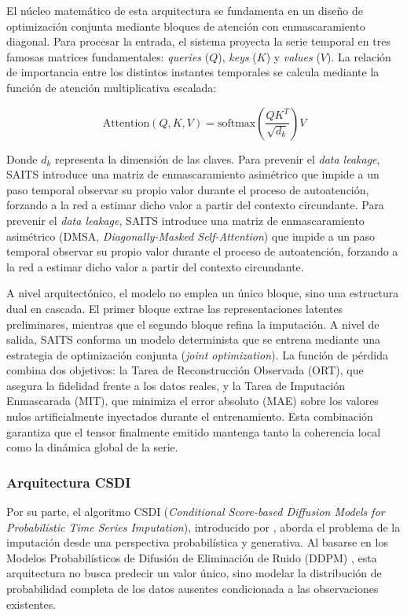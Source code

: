 El núcleo matemático de esta arquitectura se fundamenta en un diseño de optimización conjunta mediante bloques de atención con enmascaramiento diagonal. Para procesar la entrada, el sistema proyecta la serie temporal en tres famosas matrices fundamentales: \textit{queries} ($Q$), \textit{keys} ($K$) y \textit{values} ($V$). La relación de importancia entre los distintos instantes temporales se calcula mediante la función de atención multiplicativa escalada:

\begin{equation}
	\text{Attention}(Q, K, V) = \text{softmax}\left(\frac{QK^T}{\sqrt{d_k}}\right)V
\end{equation}

Donde $d_k$ representa la dimensión de las claves. Para prevenir el \textit{data leakage}, SAITS introduce una matriz de enmascaramiento asimétrico que impide a un paso temporal observar su propio valor durante el proceso de autoatención, forzando a la red a estimar dicho valor a partir del contexto circundante. Para prevenir el \textit{data leakage}, SAITS introduce una matriz de enmascaramiento asimétrico (DMSA, \textit{Diagonally-Masked Self-Attention}) que impide a un paso temporal observar su propio valor durante el proceso de autoatención, forzando a la red a estimar dicho valor a partir del contexto circundante. 

A nivel arquitectónico, el modelo no emplea un único bloque, sino una estructura dual en cascada. El primer bloque extrae las representaciones latentes preliminares, mientras que el segundo bloque refina la imputación. A nivel de salida, SAITS conforma un modelo determinista que se entrena mediante una estrategia de optimización conjunta (\textit{joint optimization}). La función de pérdida combina dos objetivos: la Tarea de Reconstrucción Observada (ORT), que asegura la fidelidad frente a los datos reales, y la Tarea de Imputación Enmascarada (MIT), que minimiza el error absoluto (MAE) sobre los valores nulos artificialmente inyectados durante el entrenamiento. Esta combinación garantiza que el tensor finalmente emitido mantenga tanto la coherencia local como la dinámica global de la serie.

\subsubsection{Arquitectura CSDI}

Por su parte, el algoritmo CSDI (\textit{Conditional Score-based Diffusion Models for Probabilistic Time Series Imputation}), introducido por \textcite{tashiro2021csdi}, aborda el problema de la imputación desde una perspectiva probabilística y generativa. Al basarse en los Modelos Probabilísticos de Difusión de Eliminación de Ruido (DDPM) \parencite{ho2020denoising}, esta arquitectura no busca predecir un valor único, sino modelar la distribución de probabilidad completa de los datos ausentes condicionada a las observaciones existentes.

